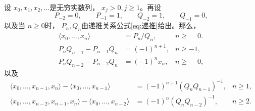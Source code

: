 \begin{theorem} \label{thrm:PQ}
	设 \( x_0, x_1, x_2, \dots \)是无穷实数列， \( x_j > 0, j \geqslant 1 \)。再设
	\begin{equation}\label{thrm02eq:00}
		P_{-2} = 0,\qquad P_{-1} = 1,\qquad Q_{-2} = 1,\qquad Q_{-1} = 0,
	\end{equation}
	以及当 \( n \geqslant 0 \)时， \( P_n, Q_n \)由递推关系公式\eqref{eq:递推}给出。那么，
	\begin{align}
		\langle x_0, \dots, x_n \rangle & = P_n / Q_n,  & n \geqslant \phantom{-}0. \label{thrm02eq:01} \\
		P_nQ_{n-1} - P_{n-1}Q_n         & = (-1)^{n+1}, & n \geqslant -1,           \label{thrm02eq:02} \\
		P_nQ_{n-2} - P_{n-2}Q_n         & = (-1)^nx_n,  & n \geqslant \phantom{-}0,\label{thrm02eq:03}
	\end{align}
	以及
	\begin{align}
		\langle x_0, \dots, x_{n-1}, x_n \rangle - \langle x_0, \dots, x_{n-1} \rangle
		 & = (-1)^{n+1}(Q_nQ_{n-1})^{-1}, & n \geqslant 1, \label{thrm02eq:04} \\
		\langle x_0, \dots,x_{n-2},  x_{n-1}, x_n \rangle - \langle x_0, \dots, x_{n-2} \rangle
		 & = (-1)^{n}(Q_nQ_{n-2})^{-1},   & n \geqslant 2.\label{thrm02eq:05}
	\end{align}
\end{theorem}

